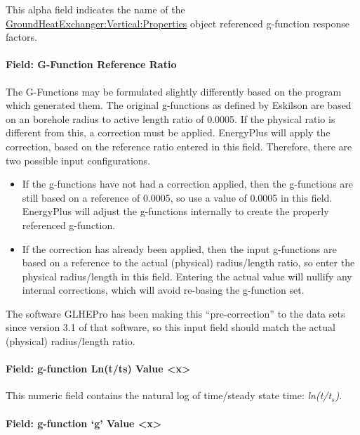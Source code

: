 This alpha field indicates the name of the \hyperref[groundheatexchangerverticalproperties]{GroundHeatExchanger:Vertical:Properties} object referenced g-function response factors.

\paragraph{Field: G-Function Reference Ratio}\label{field-g-function-reference-ratio}

The G-Functions may be formulated slightly differently based on the program which generated them. The original g-functions as defined by Eskilson are based on an borehole radius to active length ratio of 0.0005. If the physical ratio is different from this, a correction must be applied. EnergyPlus will apply the correction, based on the reference ratio entered in this field. Therefore, there are two possible input configurations.

\begin{itemize}
\item
  If the g-functions have not had a correction applied, then the g-functions are still based on a reference of 0.0005, so use a value of 0.0005 in this field. EnergyPlus will adjust the g-functions internally to create the properly referenced g-function.
\item
  If the correction has already been applied, then the input g-functions are based on a reference to the actual (physical) radius/length ratio, so enter the physical radius/length in this field. Entering the actual value will nullify any internal corrections, which will avoid re-basing the g-function set.
\end{itemize}

The software GLHEPro has been making this ``pre-correction'' to the data sets since version 3.1 of that software, so this input field should match the actual (physical) radius/length ratio.

\paragraph{Field: g-function Ln(t/ts) Value \textless{}x\textgreater{}}\label{field-g-function-lntts-value-x}

This numeric field contains the natural log of time/steady state time: \emph{ln(t/t\(_{s}\))}.

\paragraph{Field: g-function `g' Value \textless{}x\textgreater{}}\label{field-g-function-g-value-x}

